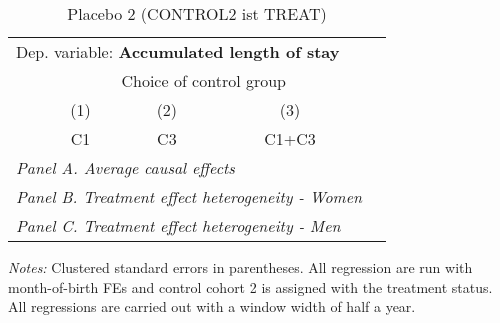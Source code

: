  \begin{table}[H] \centering \begin{threeparttable} \caption{Placebo 2 (CONTROL2 ist TREAT) } {\def\sym#1{\ifmmode^{#1}\else\(^{#1}\)\fi} \begin{tabular}{l*{4}{c}} \toprule \multicolumn{4}{l}{Dep. variable: \textbf{Accumulated length of stay}} \\ & \multicolumn{3}{c}{Choice of control group} \\ \cmidrule(lr){2-4}
            &\multicolumn{1}{c}{(1)}&\multicolumn{1}{c}{(2)}&\multicolumn{1}{c}{(3)}\\
            &\multicolumn{1}{c}{C1}&\multicolumn{1}{c}{C3}&\multicolumn{1}{c}{C1+C3}\\
\midrule
 \multicolumn{4}{l}{\emph{Panel A. Average causal effects}} \\      \midrule\multicolumn{4}{l}{\emph{Panel B. Treatment effect heterogeneity - Women}} \\      \midrule\multicolumn{4}{l}{\emph{Panel C. Treatment effect heterogeneity - Men}} \\      
\bottomrule \end{tabular} } \begin{tablenotes} \item \scriptsize \emph{Notes:} Clustered standard errors in parentheses. All regression are run with month-of-birth FEs and control cohort 2 is assigned with the treatment status. All regressions are carried out with a window width of half a year. \end{tablenotes} \end{threeparttable} \end{table} 
